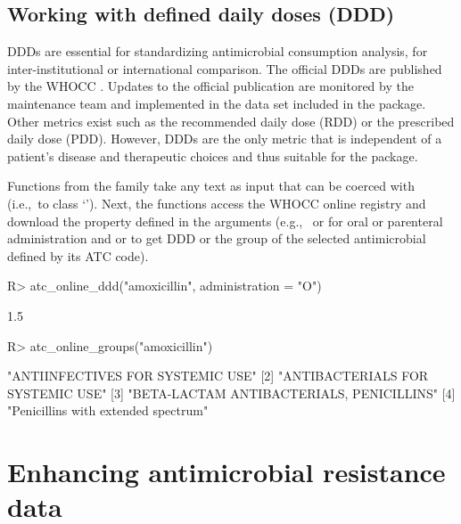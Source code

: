 \documentclass[article, shortnames]{jss}
\newcommand{\class}[1]{`\code{#1}'}
\newcommand{\fct}[1]{\code{#1()}}
\begin{document}
\subsection{Working with defined daily doses (DDD)}

DDDs are essential for standardizing antimicrobial consumption analysis, for
inter-institutional or international comparison.  The official DDDs are
published by the WHOCC
\citep{WHO_Collaborating_Center_for_Drug_Statistics_Methodology_undated-sl}. 
Updates to the official publication are monitored by the 
maintenance team and implemented in the  data set included
in the  package.  Other metrics exist such as the recommended daily
dose (RDD) or the prescribed daily dose (PDD).  However, DDDs are the only
metric that is independent of a patient's disease and therapeutic choices
and thus suitable for the  package.

Functions from the \fct{atc\_online\_*} family take any text as input that
can be coerced with \fct{as.ab} (i.e.,~to class \class{ab}).  Next, the
functions access the WHOCC online registry
\citep[][internet connection required]{WHO_Collaborating_Center_for_Drug_Statistics_Methodology_undated-sl}
and download the property defined in the
arguments (e.g.,~ or 
for oral or parenteral administration and  or
 to get DDD or the group of the selected
antimicrobial defined by its ATC code).
%
\begin{CodeChunk}
\begin{CodeInput}
R> atc_online_ddd("amoxicillin", administration = "O")
\end{CodeInput}
\begin{CodeOutput}
[1] 1.5
\end{CodeOutput}
\begin{CodeInput}
R> atc_online_groups("amoxicillin")
\end{CodeInput}
\begin{CodeOutput}
[1] "ANTIINFECTIVES FOR SYSTEMIC USE"        
[2] "ANTIBACTERIALS FOR SYSTEMIC USE"        
[3] "BETA-LACTAM ANTIBACTERIALS, PENICILLINS"
[4] "Penicillins with extended spectrum"     
\end{CodeOutput}
\end{CodeChunk}
%

\section{Enhancing antimicrobial resistance data} \label{sec:enhancing}
\end{document}
